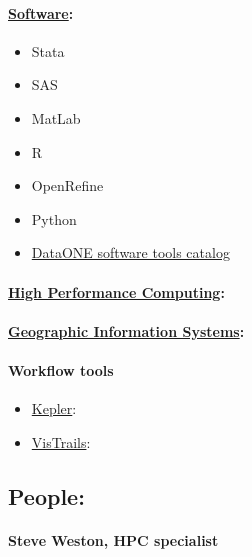 \documentclass{tufte-handout}
\begin{document}
\paragraph{\href{http://csssi.yale.edu/tech}{Software}:}\label{software}

\begin{itemize}
\itemsep1pt\parskip0pt
\item
  Stata
\item
  SAS
\item
  MatLab
\item
  R
\item
  OpenRefine
\item
  Python
\item
  \href{http://www.dataone.org/software_tools_catalog}{DataONE software
  tools catalog}
\end{itemize}

\paragraph{\href{http://its.yale.edu/services/research-technologies/high-performance-computing}{High
Performance Computing}:}\label{high-performance-computing}

\paragraph{\href{http://guides.library.yale.edu/gis}{Geographic
Information Systems}:}\label{geographic-information-systems}

\paragraph{Workflow tools}\label{workflow-tools}

\begin{itemize}
\itemsep1pt\parskip0pt
\item
  \href{https://kepler-project.org/}{Kepler}:
\item
  \href{http://www.vistrails.org/index.php/Main_Page}{VisTrails}:
\end{itemize}

\subsection{People:}\label{people}

\paragraph{Steve Weston, HPC
specialist}\label{steve-weston-hpc-specialist}
\end{document}
